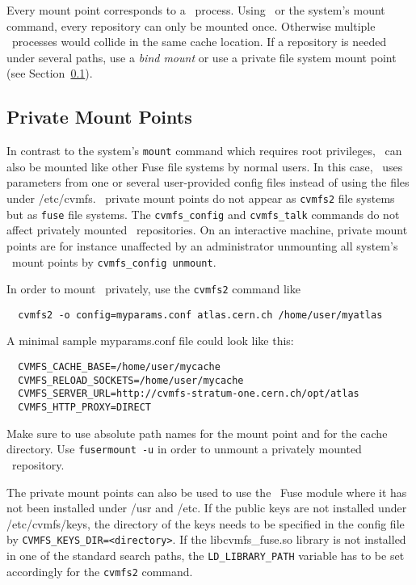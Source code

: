 Every mount point corresponds to a \cvmfs\ process.
Using \autofs\ or the system's mount command, every repository can only be mounted once.
Otherwise multiple \cvmfs\ processes would collide in the same cache location.
If a repository is needed under several paths, use a \emph{bind mount} or use a private file system mount point (see Section~\ref{sct:privatemount}).

\subsection{Private Mount Points}
\label{sct:privatemount}
In contrast to the system's \texttt{mount} command which requires root privileges, \cvmfs\ can also be mounted like other Fuse file systems by normal users.
In this case, \cvmfs\ uses parameters from one or several user-provided config files instead of using the files under /etc/cvmfs.
\cvmfs\ private mount points do not appear as \texttt{cvmfs2} file systems but as \texttt{fuse} file systems.
The \texttt{cvmfs\_config} and \texttt{cvmfs\_talk} commands do not affect privately mounted \cvmfs\ repositories.
On an interactive machine, private mount points are for instance unaffected by an administrator unmounting all system's \cvmfs\ mount points by \texttt{cvmfs\_config unmount}.

In order to mount \cvmfs\ privately, use the \texttt{cvmfs2} command like
\begin{verbatim}
  cvmfs2 -o config=myparams.conf atlas.cern.ch /home/user/myatlas
\end{verbatim}
A minimal sample myparams.conf file could look like this:
\begin{verbatim}
  CVMFS_CACHE_BASE=/home/user/mycache
  CVMFS_RELOAD_SOCKETS=/home/user/mycache
  CVMFS_SERVER_URL=http://cvmfs-stratum-one.cern.ch/opt/atlas
  CVMFS_HTTP_PROXY=DIRECT
\end{verbatim}

Make sure to use absolute path names for the mount point and for the cache directory.
Use \texttt{fusermount -u} in order to unmount a privately mounted \cvmfs\ repository.

The private mount points can also be used to use the \cvmfs\ Fuse module where it has not been installed under /usr and /etc.
If the public keys are not installed under /etc/cvmfs/keys, the directory of the keys needs to be specified in the config file by \texttt{CVMFS\_KEYS\_DIR=<directory>}.
If the libcvmfs\_fuse.so library is not installed in one of the standard search paths, the \texttt{LD\_LIBRARY\_PATH} variable has to be set accordingly for the \texttt{cvmfs2} command.

